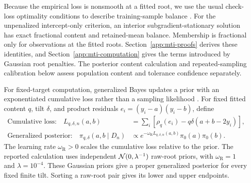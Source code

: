 Because the empirical loss is nonsmooth at a fitted root, we use the usual
check-loss optimality conditions to describe training-sample balance
\citep{qdesn-KoenkerBassett1978}. For the unpenalized intercept-only criterion,
an interior subgradient-stationary solution has exact fractional content and
retained-mean balance. Membership is fractional only for observations at the
fitted roots. Section~\ref{app:mti-proofs} derives these identities, and
Section~\ref{app:mti-computation} gives the terms introduced by Gaussian root
penalties. The posterior content calculation and repeated-sampling calibration
below assess population content and tolerance confidence separately.

For fixed-target computation, generalized Bayes updates a prior with an
exponentiated cumulative loss rather
than a sampling likelihood \citep{rqr-BissiriHolmesWalker2016GeneralBayes}.
For fixed fitted content \(q\), tilt \(\delta\), and product residuals
\(e_i=(y_i-a)(y_i-b)\), define
\begin{align}
\text{Cumulative loss:}\quad
L_{q,\delta,n}(a,b)
&=\sum_i[\rho_q(e_i)-q\delta(a+b-2y_i)],
\label{rqr2026:eq:mti-computational-loss}\\
\text{Generalized posterior:}\quad
\pi_{q,\delta}(a,b\mid D_n)
&\propto e^{-\omega_{\mathrm R}L_{q,\delta,n}(a,b)}\pi_0(a)\pi_0(b).
\label{rqr2026:eq:mti-generalized-posterior}
\end{align}
The learning rate \(\omega_{\mathrm R}>0\) scales the cumulative loss relative
to the prior. The reported calculation uses independent
\(\mathcal{N}(0,\lambda^{-1})\) raw-root priors, with
\(\omega_{\mathrm R}=1\) and \(\lambda=10^{-4}\). These Gaussian priors give a
proper generalized posterior for every fixed finite tilt. Sorting a raw-root
pair gives its lower and upper endpoints.

